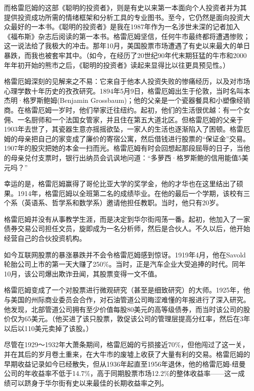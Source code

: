 \documentclass[12pt,oneside]{book}
\begin{document}
而格雷厄姆的这部《聪明的投资者》，则是有史以来第一本面向个人投资者并为其提供投资成功所需的情绪框架和分析工具的专业图书。至今，它仍然是面向投资大众最好的一本书。《聪明的投资者》是我在1987年作为一名涉世未深的记者加入《福布斯》杂志后阅读的第一本书。格雷厄姆坚信，任何牛市最终都将遭遇惨败；这一说法给了我极大的冲击。那年10月，美国股票市场遭遇了有史以来最大的单日暴跌，而我也被套牢其中。（如今，在经历了20世纪90年代末期狂猛的牛市和2000年年初开始的熊市之后，《聪明的投资者》读起来显得比以往更具预见性。）

格雷厄姆深刻的见解来之不易：它来自于他本人投资失败的惨痛经历，以及对市场心理学数十年历史的孜孜研究。1894年5月9日，格雷厄姆出生于伦敦，当时名叫本杰明·格罗斯鲍姆(Benjamin Grossbaum)；他的父亲是一个瓷器餐具和小塑像经销商。在格雷厄姆一岁时，他们举家迁往纽约。起初，他们的生活很优越：有一个女佣、一名厨师和一个法国女管家，并且住在第五大道北区。但格雷厄姆的父亲于1903年去世了，其瓷器生意亦摇摇欲坠，一家人的生活也逐渐陷入了困顿。格雷厄姆的母亲把自己的家变成了廉价的寄宿公寓，然后借钱进行股票的“保证金”交易。1907年的股灾把她的本金一扫而光。格雷厄姆有时会回想起那段屈辱的日子，当他的母亲兑付支票时，银行出纳员会讥讽地问道：“多萝西·格罗斯鲍的信用能值5美元吗？”

幸运的是，格雷厄姆赢得了哥伦比亚大学的奖学金，他的才华也在这里结出了硕果。1914年，格雷厄姆以全班第二名的成绩毕业。在他的最后一个学期，该校有三个系（英语系、哲学系和数学系）邀请他担任教职。当时，他只有20岁。

格雷厄姆并没有从事教学生涯，而是决定到华尔街闯荡一番。起初，他加入了一家债券交易公司担任文员，旋即成为一名分析师，然后是合伙人。不久以后，他开始经营自己的合伙投资机构。

如今互联网股票的暴涨暴跌并不会令格雷厄姆感到惊讶。1919年4月，他在Savold轮胎公司上市的第一天大赚了250\%。当时，正是汽车企业大受追捧的时代。同年10月，该公司爆出欺诈丑闻，其股票变得一文不值。

格雷厄姆变成了一个对股票进行微观研究（甚至是细致研究）的大师。1925年，他与美国的州际商业委员会合作，对石油管道公司晦涩难懂的年报进行了深入研究。他发现，北部管道公司拥有至少价值每股80美元的高等级债券，而当时该公司的股价仅为65美元。（他买进了该只股票，敦促该公司的管理层提高分红率，然后在3年以后以110美元卖掉了该股。）

尽管在1929～1932年大萧条期间，格雷厄姆的亏损接近70\%，但他闯过了这一关，并在其后的岁月卷土重来，在大牛市的废墟上收获了大量有利的交易。格雷厄姆的早期收益记录如今已经散失，但从1936年起直至1956年退休，他的格雷厄姆-纽曼公司的年收益率不低于14.7\%，高于同期股票市场12.2\%的整体收益率——这一成绩可以跻身于华尔街有史以来最佳的长期收益率之列。
\end{document}

